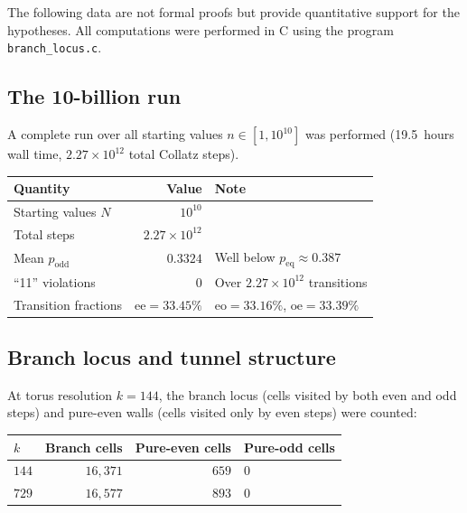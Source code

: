 \documentclass[manuscript]{aomart}
\theoremstyle{plain}
\theoremstyle{definition}
\theoremstyle{remark}
\numberwithin{equation}{section}
\begin{document}
The following data are not formal proofs but provide quantitative
support for the hypotheses.  All computations were performed in C
using the program \texttt{branch\_locus.c}.

\subsection{The 10-billion run}

A complete run over all starting values $n \in [1, 10^{10}]$ was
performed (19.5~hours wall time, $2.27 \times 10^{12}$ total Collatz
steps).

\begin{center}
\renewcommand{\arraystretch}{1.3}
\begin{tabular}{lrl}
  \toprule
  \textbf{Quantity} & \textbf{Value} & \textbf{Note} \\
  \midrule
  Starting values $N$ & $10^{10}$ & \\
  Total steps & $2.27 \times 10^{12}$ & \\
  Mean $p_{\mathrm{odd}}$ & $0.3324$ & Well below
    $p_{\mathrm{eq}} \approx 0.387$ \\
  ``11'' violations & $0$ & Over $2.27 \times 10^{12}$ transitions \\
  Transition fractions & $\mathrm{ee} = 33.45\%$ &
    $\mathrm{eo} = 33.16\%$, $\mathrm{oe} = 33.39\%$ \\
  \bottomrule
\end{tabular}
\end{center}

\subsection{Branch locus and tunnel structure}

At torus resolution $k = 144$, the branch locus (cells visited by
both even and odd steps) and pure-even walls (cells visited only by
even steps) were counted:

\begin{center}
\renewcommand{\arraystretch}{1.3}
\begin{tabular}{lrrl}
  \toprule
  \textbf{$k$} & \textbf{Branch cells} & \textbf{Pure-even cells}
  & \textbf{Pure-odd cells} \\
  \midrule
  $144$ & $16{,}371$ & $659$ & $0$ \\
  $729$ & $16{,}577$ & $893$ & $0$ \\
  \bottomrule
\end{tabular}
\end{center}
\end{document}

